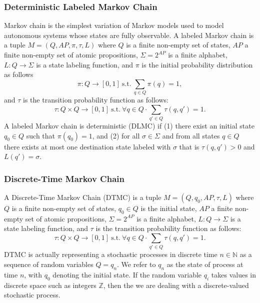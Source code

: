 \documentclass[
a4paper,
12pt
]{scrartcl}
\begin{document}
\subsubsection{Deterministic Labeled Markov Chain}
Markov chain is the simplest variation of Markov models used to model autonomous systems whose states are fully observable. A labeled Markov chain is a tuple $M=(Q,AP,\pi,\tau,L)$ where $Q$ is a finite non-empty set of states, $AP$ a finite non-empty set of atomic propositions, $\Sigma=2^{AP}$ is a finite alphabet, $L:Q\to \Sigma$ is a state labeling function, and $\pi$ is the initial probability distribution as follows
\begin{equation*}
  \pi:Q\to [0,1]~\text{s.t.}~\sum_{q\in Q} \pi(q)=1,
\end{equation*}
and $\tau$ is the transition probability function as follows:
\begin{equation*}
  \tau: Q\times Q \to [0,1]~\text{s.t.}~\forall q \in Q \cdot \sum_{q'\in Q}\tau(q,q')=1.
\end{equation*}
A labeled Markov chain is deterministic (DLMC) if (1) there exist an initial state $q_0\in Q$ such that $\pi(q_0)=1$, and (2) for all $\sigma \in \Sigma$ and from all states $q \in Q$ there exists at most one destination state labeled with $\sigma$ that is $\tau(q,q')>0$ and $L(q')=\sigma$.
\subsubsection{Discrete-Time Markov Chain}
\par A Discrete-Time Markov Chain (DTMC) is a tuple $M=(Q,q_0,AP,\tau,L)$ where $Q$ is a finite non-empty set of states, $q_0\in Q$ is the initial state, $AP$ a finite non-empty set of atomic propositions, $\Sigma=2^{AP}$ is a finite alphabet, $L:Q\to \Sigma$ is a state labeling function, and $\tau$ is the transition probability function as follows:
\begin{equation*}
  \tau: Q\times Q \to [0,1]~\text{s.t.}~\forall q \in Q \cdot \sum_{q'\in Q}\tau(q,q')=1.
\end{equation*}
DTMC is actually representing a stochastic processes in discrete time $n \in \mathbb{N}$ as a sequence of random variables $Q={q_n}$. We refer to $q_n$ as the state of process at time $n$, with $q_0$ denoting the initial state. If the random variable $q_i$ takes values in discrete space such as integers $\mathbb{Z}$, then the we are dealing with a discrete-valued stochastic process.
\end{document}
